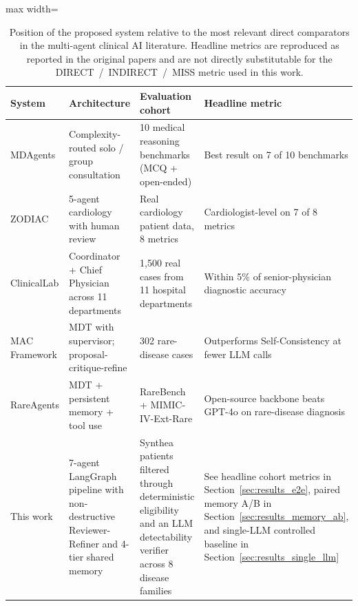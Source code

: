 \begin{table}[!htbp]
\centering
\caption{Position of the proposed system relative to the most relevant
direct comparators in the multi-agent clinical AI literature.
Headline metrics are reproduced as reported in the original papers
and are not directly substitutable for the DIRECT~/~INDIRECT~/~MISS
metric used in this work.}
\label{tab:literature_comparison}
\footnotesize
\begin{adjustbox}{max width=\textwidth}
\begin{tabular}{@{}p{32mm}p{36mm}p{34mm}p{44mm}@{}}
\toprule
\textbf{System} & \textbf{Architecture} & \textbf{Evaluation cohort} & \textbf{Headline metric} \\
\midrule
MDAgents \newline \cite{Kim2024MDAgents}
  & Complexity-routed solo / group consultation
  & 10 medical reasoning benchmarks (MCQ + open-ended)
  & Best result on 7 of 10 benchmarks \\
ZODIAC \newline \cite{Zhou2024ZODIAC}
  & 5-agent cardiology with human review
  & Real cardiology patient data, 8 metrics
  & Cardiologist-level on 7 of 8 metrics \\
ClinicalLab \newline \cite{Yan2024ClinicalLab}
  & Coordinator + Chief Physician across 11 departments
  & 1{,}500 real cases from 11 hospital departments
  & Within 5\% of senior-physician diagnostic accuracy \\
MAC Framework \newline \cite{MAC2025npj}
  & MDT with supervisor; proposal-critique-refine
  & 302 rare-disease cases
  & Outperforms Self-Consistency at fewer LLM calls \\
RareAgents \newline \cite{Chen2024RareAgents}
  & MDT + persistent memory + tool use
  & RareBench + MIMIC-IV-Ext-Rare
  & Open-source backbone beats GPT-4o on rare-disease diagnosis \\
\midrule
This work
  & 7-agent LangGraph pipeline with non-destructive Reviewer-Refiner and 4-tier shared memory
  & Synthea patients filtered through deterministic eligibility and an LLM detectability verifier across 8 disease families
  & See headline cohort metrics in Section~\ref{sec:results_e2e}, paired memory A/B in Section~\ref{sec:results_memory_ab}, and single-LLM controlled baseline in Section~\ref{sec:results_single_llm} \\
\bottomrule
\end{tabular}
\end{adjustbox}
\end{table}

